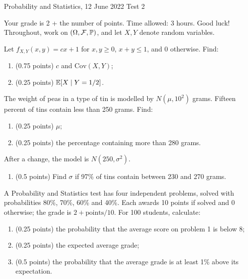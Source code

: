 \documentclass[a4paper]{report}
\begin{document}
\noindent Probability and Statistics, 12 June 2022 \hfill Test 2
\hrulefill
\begin{it}Your grade is 2 + the number of points. Time allowed: 3 hours. Good luck! Throughout, work on $(\Omega,\mathcal F,\P)$, and let $X,Y$ denote random variables.\end{it}
\begin{problem}
Let $f_{X,Y}(x,y)=cx+1$ for $x,y\geq0$, $x+y\leq1$, and 0 otherwise. Find:
\begin{enumerate}
\item (0.75 points) $c$ and $\mathrm{Cov}(X,Y)$;
\item (0.25 points) $\E[X\mid Y=1/2]$.
\end{enumerate}
\end{problem}
\begin{problem}
The weight of peas in a type of tin is modelled by $N(\mu,10^2)$ grams. Fifteen percent of tins contain less than 250 grams. Find:
\begin{enumerate}
\item (0.25 points) $\mu$;
\item (0.25 points) the percentage containing more than 280 grams.
\end{enumerate}
After a change, the model is $N(250,\sigma^2)$.
\begin{enumerate}[start=3]
\item (0.5 points) Find $\sigma$ if 97\% of tins contain between 230 and 270 grams.
\end{enumerate}
\end{problem}
\begin{problem}
A Probability and Statistics test has four independent problems, solved with probabilities 80\%, 70\%, 60\% and 40\%. Each awards 10 points if solved and 0 otherwise; the grade is $2+\mathrm{points}/10$. For 100 students, calculate:
\begin{enumerate}
\item (0.25 points) the probability that the average score on problem 1 is below 8;
\item (0.25 points) the expected average grade;
\item (0.5 points) the probability that the average grade is at least 1\% above its expectation.
\end{enumerate}
\end{problem}
\end{document}
